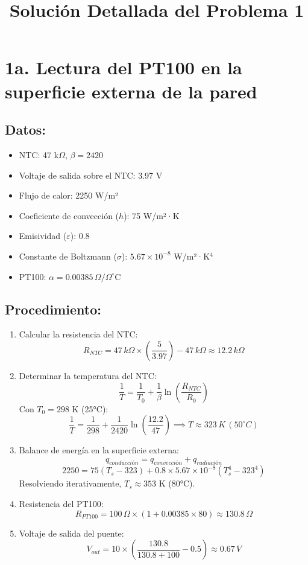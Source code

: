 \documentclass[a4paper,12pt]{article}
\title{Solución Detallada del Problema 1}
\author{}
\date{}
\begin{document}
\maketitle

\section*{1a. Lectura del PT100 en la superficie externa de la pared}

\subsection*{Datos:}
\begin{itemize}
    \item NTC: 47 k$\Omega$, $\beta = 2420$
    \item Voltaje de salida sobre el NTC: 3.97 V
    \item Flujo de calor: 2250 W/m²
    \item Coeficiente de convección ($h$): 75 W/m²·K
    \item Emisividad ($\varepsilon$): 0.8
    \item Constante de Boltzmann ($\sigma$): $5.67 \times 10^{-8}$ W/m²·K$^4$
    \item PT100: $\alpha = 0.00385 \, \Omega/\Omega^\circ$C
\end{itemize}

\subsection*{Procedimiento:}

\begin{enumerate}
    \item Calcular la resistencia del NTC:
    \[
    R_{NTC} = 47 \, k\Omega \times \left(\frac{5}{3.97}\right) - 47 \, k\Omega \approx 12.2 \, k\Omega
    \]

    \item Determinar la temperatura del NTC:
    \[
    \frac{1}{T} = \frac{1}{T_0} + \frac{1}{\beta} \ln\left(\frac{R_{NTC}}{R_0}\right)
    \]
    Con $T_0 = 298$ K (25°C):
    \[
    \frac{1}{T} = \frac{1}{298} + \frac{1}{2420} \ln\left(\frac{12.2}{47}\right) \implies T \approx 323 \, K \, (50^\circ C)
    \]

    \item Balance de energía en la superficie externa:
    \[
    q_{conducción} = q_{convección} + q_{radiación}
    \]
    \[
    2250 = 75(T_s - 323) + 0.8 \times 5.67 \times 10^{-8} (T_s^4 - 323^4)
    \]
    Resolviendo iterativamente, $T_s \approx 353$ K (80°C).

    \item Resistencia del PT100:
    \[
    R_{PT100} = 100 \, \Omega \times (1 + 0.00385 \times 80) \approx 130.8 \, \Omega
    \]

    \item Voltaje de salida del puente:
    \[
    V_{out} = 10 \times \left(\frac{130.8}{130.8 + 100} - 0.5\right) \approx 0.67 \, V
    \]
\end{enumerate}
\end{document}
